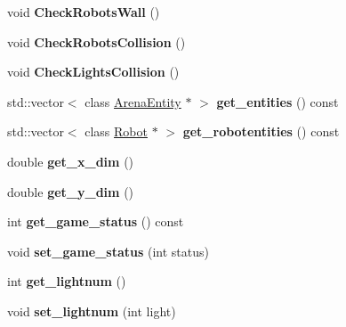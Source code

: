 \begin{DoxyCompactItemize}
\mbox{\label{class_arena_a558e69e8db4119847f806cc28d73eea2}} 
void {\bfseries Check\+Robots\+Wall} ()
\item 
\mbox{\label{class_arena_a924bc1704410aa262d600c2ae98f1196}} 
void {\bfseries Check\+Robots\+Collision} ()
\item 
\mbox{\label{class_arena_a0213de62ebb859d19d9948818da15d06}} 
void {\bfseries Check\+Lights\+Collision} ()
\item 
\mbox{\label{class_arena_a952408e8197790a034b75a4e275bcbc2}} 
std\+::vector$<$ class \mbox{\hyperlink{class_arena_entity}{Arena\+Entity}} $\ast$ $>$ {\bfseries get\+\_\+entities} () const
\item 
\mbox{\label{class_arena_a06c734e89a6e15dda458f7f8d470ba44}} 
std\+::vector$<$ class \mbox{\hyperlink{class_robot}{Robot}} $\ast$ $>$ {\bfseries get\+\_\+robotentities} () const
\item 
\mbox{\label{class_arena_a5e3be20f2c67338a5a684b85a66f6b96}} 
double {\bfseries get\+\_\+x\+\_\+dim} ()
\item 
\mbox{\label{class_arena_a35737d65ff32f2bd5871f0bdfbc10a85}} 
double {\bfseries get\+\_\+y\+\_\+dim} ()
\item 
\mbox{\label{class_arena_a4d599cccea003b9c60ddb39535c058f4}} 
int {\bfseries get\+\_\+game\+\_\+status} () const
\item 
\mbox{\label{class_arena_ac8e8b3438db02aa5395f7fcb537ed952}} 
void {\bfseries set\+\_\+game\+\_\+status} (int status)
\item 
\mbox{\label{class_arena_a88c02c0bb953b7c79e0448425d495cc1}} 
int {\bfseries get\+\_\+lightnum} ()
\item 
\mbox{\label{class_arena_af412c437c8b748c2fe59dfa456b82be2}} 
void {\bfseries set\+\_\+lightnum} (int light)
\item 
\mbox{\label{class_arena_adbe0661ec6d40464367152722b7731d1}} 

\end{DoxyCompactItemize}
